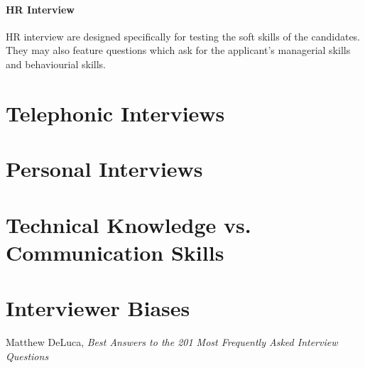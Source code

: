 \documentclass[a4paper,12pt]{report}
\begin{document}
\subsubsection{HR Interview}
HR interview are designed specifically for testing the soft skills of the candidates. They may also feature questions
which ask for the applicant's managerial skills and behaviourial skills. 
\chapter{Telephonic Interviews}
\section{}
\subsection{}
\chapter{Personal Interviews}
\section{}
\subsection{}
\appendix
\chapter{Technical Knowledge vs. Communication Skills}
\chapter{Interviewer Biases}
\begin{thebibliography}{9}
  Matthew DeLuca,
  \emph{Best Answers to the 201 Most Frequently Asked Interview Questions}
\end{thebibliography}
\end{document}
